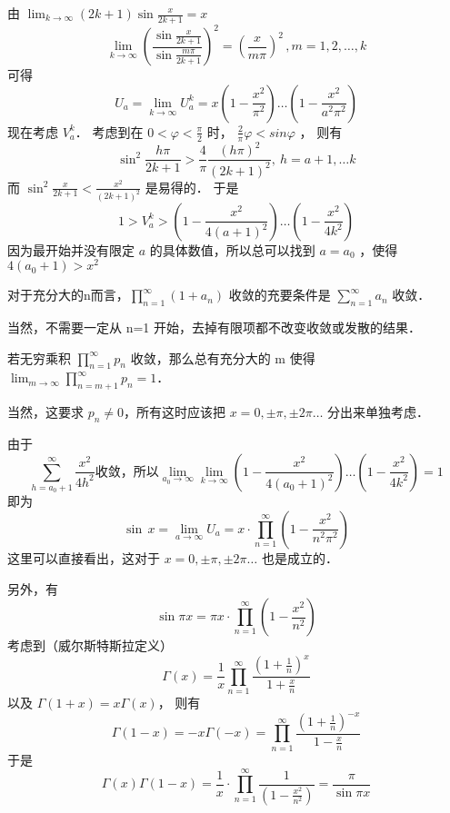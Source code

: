 由  $\lim_{k\rightarrow\infty}(2k+1)\sin\frac{x}{2k+1}=x$
\begin{equation}
\lim_{k\rightarrow\infty}\left( \frac{\sin\frac{x}{2k+1}}{\sin\frac{m\pi}{2k+1}} \right)^2=\left( \frac{x}{m\pi} \right)^2\,,m=1,2,\dots,k
\end{equation}
可得
\begin{equation}
U_a=\lim_{k\rightarrow\infty}U^k_a=x(1-\frac{x^2}{\pi^2})\dots(1-\frac{x^2}{a^2\pi^2})
\end{equation}
现在考虑 $V^k_a$． 考虑到在 $0<\varphi<\frac\pi2 $ 时， $\frac2\pi\varphi<sin\varphi$ ，
则有
\begin{equation}
\sin^2\frac {h\pi}{2k+1}>\frac4\pi\frac{(h\pi)^2}{(2k+1)^2},\ h=a+1,\dots k 
\end{equation}
而 $\sin^2\frac x{2k+1}<\frac{x^2}{(2k+1)^2}$ 是易得的． 于是
\begin{equation}
1>V^k_a>(1-\frac{x^2}{4(a+1)^2})\dots(1-\frac{x^2}{4k^2})
\end{equation}
因为最开始并没有限定 $a$ 的具体数值，所以总可以找到 $a=a_0$ ，使得 $4(a_0+1)>x^2$
\begin{lemma}{}
对于充分大的n而言，$\prod_{n=1}^{\infty}(1+a_n) $ 收敛的充要条件是  $\sum_{n=1}^{\infty}{a_n}$ 收敛．
\end{lemma}
当然，不需要一定从 n=1 开始，去掉有限项都不改变收敛或发散的结果．
\begin{lemma}{}
若无穷乘积 $\prod_{n=1}^{\infty}p_n$ 收敛，那么总有充分大的 m 使得 $\lim_{m\rightarrow\infty}\prod_{n=m+1}^{\infty}p_n=1$．
\end{lemma}
当然，这要求 $ p_n\ne0 $，所有这时应该把 $ x=0,\pm\pi,\pm 2\pi\dots $ 分出来单独考虑．

由于
\begin{equation}
\sum_{h=a_0+1}^{\infty}{\frac{x^2}{4h^2}} \text{收敛，所以} \lim_{a_0\rightarrow\infty}\lim_{k\rightarrow\infty}(1-\frac{x^2}{4(a_0+1)^2})\dots(1-\frac{x^2}{4k^2})=1
\end{equation}
即为
\begin{equation}
\sin\,x=\lim_{a\rightarrow\infty}U_a=x\cdot \prod_{n=1}^{\infty}(1-\frac{x^2}{n^2\pi^2})
\end{equation}
这里可以直接看出，这对于 $x=0,\pm\pi,\pm 2\pi\dots $ 也是成立的．

另外，有
\begin{equation}
\sin\pi x=\pi x\cdot \prod_{n=1}^{\infty}(1-\frac{x^2}{n^2})
\end{equation}
考虑到（威尔斯特斯拉定义）
\begin{equation}
\Gamma(x)=\frac1x\prod_{n=1}^{\infty}\frac{(1+\frac1n)^{x}}{1+\frac xn}
\end{equation}
以及 $ \Gamma(1+x)=x\Gamma(x)$， 则有
\begin{equation}
\Gamma(1-x)=-x\Gamma(-x)=\prod_{n=1}^{\infty}\frac{(1+\frac1n)^{-x}}{1-\frac xn}
\end{equation}
于是
\begin{equation}
\Gamma(x)\Gamma(1-x)=\frac{1}{x}\cdot \prod_{n=1}^{\infty}\frac1{(1-\frac{x^2}{n^2})}=\frac\pi{\sin\pi x}
\end{equation}
